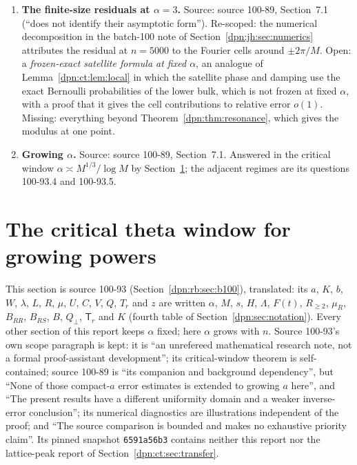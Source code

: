 \documentclass[11pt]{article}
\numberwithin{equation}{section}
\theoremstyle{definition}\newtheorem{definition}[theorem]{Definition}
\theoremstyle{remark}\newtheorem{remark}[theorem]{Remark}
\begin{document}
\begin{enumerate}[label=\textbf{100.\arabic*}, leftmargin=*]
  Theorem~\ref{dpn:rb:thm:inverse} gives the ceiling rule off an
  $O(t^{J-1})$-neighbourhood of the integers.  Open: how often
  $n^{\rm int}_{*,J}(Y)$ falls into that neighbourhood as $Y$ varies, for
  instance for $Y=\log10^m$.
\item \textbf{The finite-size residuals at $\alpha=3$.}  Source: source
  100-89, Section~7.1 (``does not identify their asymptotic form'').
  Re-scoped: the numerical decomposition in the batch-100 note of
  Section~\ref{dpn:jh:sec:numerics} attributes the residual at $n=5000$ to the
  Fourier cells around $\pm2\pi/M$.  Open: a \emph{frozen-exact satellite
  formula at fixed $\alpha$}, an analogue of Lemma~\ref{dpn:ct:lem:local} in
  which the satellite phase and damping use the exact Bernoulli
  probabilities of the lower bulk, which is not frozen at fixed $\alpha$, with
  a proof that it gives the cell contributions to relative error $o(1)$.
  Missing: everything beyond Theorem~\ref{dpn:thm:resonance}, which gives the
  modulus at one point.
\item \textbf{Growing $\alpha$.}  Source: source 100-89, Section~7.1.
  Answered in the critical window $\alpha\asymp M^{1/3}/\log M$ by
  Section~\ref{dpn:ct:sec:theta}; the adjacent regimes are its questions
  100-93.4 and 100-93.5.
\end{enumerate}

\section{The critical theta window for growing powers}\label{dpn:ct:sec:theta}
This section is source 100-93 (Section~\ref{dpn:rb:sec:b100}), translated:
its $a$, $K$, $b$, $W$, $\lambda$, $L$, $R$, $\mu$, $U$, $C$, $V$, $Q$, $T_r$
and $z$ are written $\alpha$, $M$, $s$, $H$, $\Lambda$, $F(t)$, $R_{\ge2}$,
$\mu_R$, $B_{RR}$, $B_{RS}$, $B$, $Q_\perp$, $\mathsf T_r$ and $K$ (fourth
table of Section~\ref{dpn:sec:notation}).  Every other section of this report
keeps $\alpha$ fixed; here $\alpha$ grows with $n$.  Source 100-93's own scope
paragraph is kept: it is ``an unrefereed mathematical research note, not a
formal proof-assistant development''; its critical-window theorem is
self-contained; source 100-89 is ``its companion and background dependency'',
but ``None of those compact-$a$ error estimates is extended to growing $a$
here'', and ``The present results have a different uniformity domain and a
weaker inverse-error conclusion''; its numerical diagnostics are illustrations
independent of the proof; and ``The source comparison is bounded and makes no
exhaustive priority claim''.  Its pinned snapshot \texttt{6591a56b3} contains
neither this report nor the lattice-peak report of
Section~\ref{dpn:ct:sec:transfer}.
\end{document}
